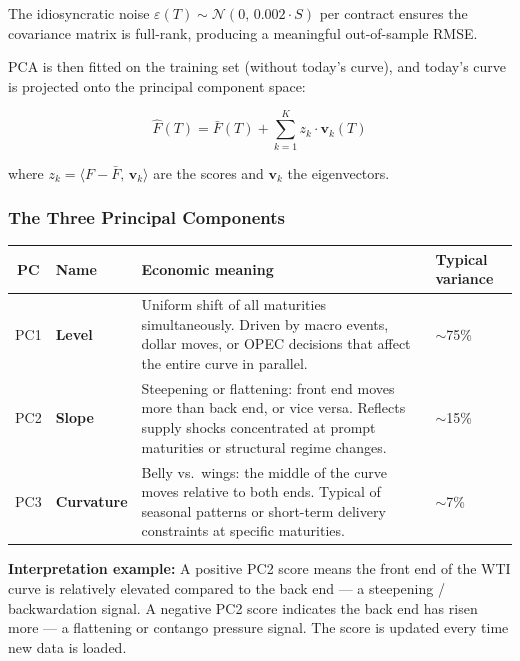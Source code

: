 \documentclass[11pt,a4paper]{article}
\newenvironment{notebox}{%
  \begin{tcolorbox}[
    colback=notebg, colframe=noteborder,
    left=8pt, right=8pt, top=5pt, bottom=5pt, boxrule=0.5pt
  ]
}{\end{tcolorbox}}
\begin{document}
The idiosyncratic noise $\varepsilon(T) \sim \mathcal{N}(0,\, 0.002 \cdot S)$ per contract ensures the covariance matrix is full-rank, producing a meaningful out-of-sample RMSE.

PCA is then fitted on the training set (without today's curve), and today's curve is
projected onto the principal component space:

\begin{equation}
\hat{F}(T) = \bar{F}(T) + \sum_{k=1}^{K} z_k \cdot \mathbf{v}_k(T)
\end{equation}

where $z_k = \langle F - \bar{F},\, \mathbf{v}_k \rangle$ are the scores and
$\mathbf{v}_k$ the eigenvectors.

\subsubsection{The Three Principal Components}

\begin{center}
\begin{tabularx}{\textwidth}{c >{\bfseries}l X l}
\toprule
PC & Name & Economic meaning & Typical variance \\
\midrule
PC1 & Level     & Uniform shift of all maturities simultaneously. Driven by macro events, dollar moves, or OPEC decisions that affect the entire curve in parallel. & $\sim$75\% \\
PC2 & Slope     & Steepening or flattening: front end moves more than back end, or vice versa. Reflects supply shocks concentrated at prompt maturities or structural regime changes. & $\sim$15\% \\
PC3 & Curvature & Belly vs.\ wings: the middle of the curve moves relative to both ends. Typical of seasonal patterns or short-term delivery constraints at specific maturities. & $\sim$7\% \\
\bottomrule
\end{tabularx}
\end{center}

\begin{notebox}
\textbf{Interpretation example:} A positive PC2 score means the front end of the WTI curve is relatively elevated compared to the back end --- a steepening / backwardation signal. A negative PC2 score indicates the back end has risen more --- a flattening or contango pressure signal. The score is updated every time new data is loaded.
\end{notebox}
\end{document}
